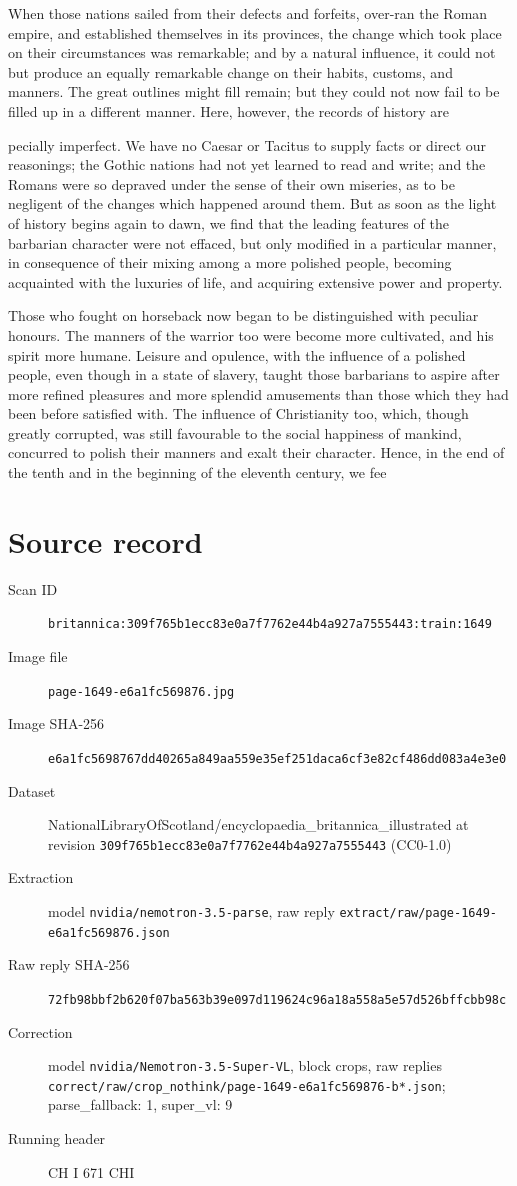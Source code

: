 \documentclass{article}
\begin{document}
When those nations sailed from their defects and forfeits, over-ran the Roman empire, and established themselves in its provinces, the change which took place on their circumstances was remarkable; and by a natural influence, it could not but produce an equally remarkable change on their habits, customs, and manners. The great outlines might fill remain; but they could not now fail to be filled up in a different manner. Here, however, the records of history are

pecially imperfect. We have no Caesar or Tacitus to supply facts or direct our reasonings; the Gothic nations had not yet learned to read and write; and the Romans were so depraved under the sense of their own miseries, as to be negligent of the changes which happened around them. But as soon as the light of history begins again to dawn, we find that the leading features of the barbarian character were not effaced, but only modified in a particular manner, in consequence of their mixing among a more polished people, becoming acquainted with the luxuries of life, and acquiring extensive power and property.

Those who fought on horseback now began to be distinguished with peculiar honours. The manners of the warrior too were become more cultivated, and his spirit more humane. Leisure and opulence, with the influence of a polished people, even though in a state of slavery, taught those barbarians to aspire after more refined pleasures and more splendid amusements than those which they had been before satisfied with. The influence of Christianity too, which, though greatly corrupted, was still favourable to the social happiness of mankind, concurred to polish their manners and exalt their character. Hence, in the end of the tenth and in the beginning of the eleventh century, we fee


\section*{Source record}
\begin{description}
\item[Scan ID] \texttt{britannica:309f765b1ecc83e0a7f7762e44b4a927a7555443:train:1649}
\item[Image file] \texttt{page-1649-e6a1fc569876.jpg}
\item[Image SHA-256] \texttt{e6a1fc5698767dd40265a849aa559e35ef251daca6cf3e82cf486dd083a4e3e0}
\item[Dataset] NationalLibraryOfScotland/encyclopaedia\_britannica\_illustrated at revision \texttt{309f765b1ecc83e0a7f7762e44b4a927a7555443} (CC0-1.0)
\item[Extraction] model \texttt{nvidia/nemotron-3.5-parse}, raw reply \texttt{extract/raw/page-1649-e6a1fc569876.json}
\item[Raw reply SHA-256] \texttt{72fb98bbf2b620f07ba563b39e097d119624c96a18a558a5e57d526bffcbb98c}
\item[Correction] model \texttt{nvidia/Nemotron-3.5-Super-VL}, block crops, raw replies \texttt{correct/raw/crop\_nothink/page-1649-e6a1fc569876-b*.json}; parse\_fallback: 1, super\_vl: 9
\item[Running header] CH I 671 CHI
\end{description}
\end{document}
